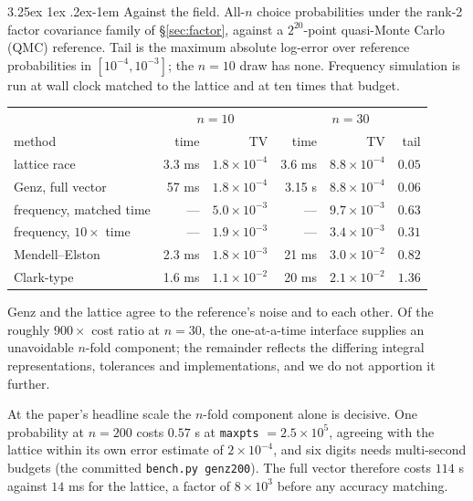 \documentclass[11pt]{article}
\makeatletter
\renewcommand\paragraph{\@startsection{paragraph}{4}{\z@}%
  {3.25ex \@plus1ex \@minus.2ex}{-1em}%
  {\normalfont\normalsize\itshape}}
\makeatother
\begin{document}
\paragraph{Against the field.} All-$n$ choice probabilities under the rank-2
factor covariance family of \S\ref{sec:factor}, against a
$2^{20}$-point quasi-Monte Carlo (QMC) reference. Tail is the maximum absolute log-error over
reference probabilities in $[10^{-4},10^{-3}]$; the $n=10$ draw has none.
Frequency simulation is run at wall clock matched to the lattice and at ten
times that budget.

\begin{center}\small
\begin{tabular}{lrrrrr}
\toprule
& \multicolumn{2}{c}{$n=10$} & \multicolumn{3}{c}{$n=30$}\\
method & time & TV & time & TV & tail\\
\midrule
lattice race & 3.3 ms & $1.8\times10^{-4}$ & 3.6 ms & $8.8\times10^{-4}$ & $0.05$\\
Genz, full vector & 57 ms & $1.8\times10^{-4}$ & 3.15 s & $8.8\times10^{-4}$ & $0.06$\\
frequency, matched time & --- & $5.0\times10^{-3}$ & --- & $9.7\times10^{-3}$ & $0.63$\\
frequency, $10\times$ time & --- & $1.9\times10^{-3}$ & --- & $3.4\times10^{-3}$ & $0.31$\\
Mendell--Elston & 2.3 ms & $1.8\times10^{-3}$ & 21 ms & $3.0\times10^{-2}$ & $0.82$\\
Clark-type & 1.6 ms & $1.1\times10^{-2}$ & 20 ms & $2.1\times10^{-2}$ & $1.36$\\
\bottomrule
\end{tabular}
\end{center}

Genz and the lattice agree to the reference's noise and to each other.
Of the roughly $900\times$ cost ratio at $n=30$, the one-at-a-time interface
supplies an unavoidable $n$-fold component; the remainder reflects the
differing integral representations, tolerances and implementations, and
we do not apportion it further.

At the paper's headline scale the $n$-fold component alone is decisive.
One probability at $n=200$ costs $0.57$ s at \texttt{maxpts}
$=2.5\times10^{5}$, agreeing with the lattice within its own error
estimate of $2\times10^{-4}$, and
six digits needs multi-second budgets (the committed \texttt{bench.py
genz200}). The full vector therefore costs $114$ s against $14$ ms for the
lattice, a factor of $8\times10^{3}$ before any accuracy matching.
\end{document}
